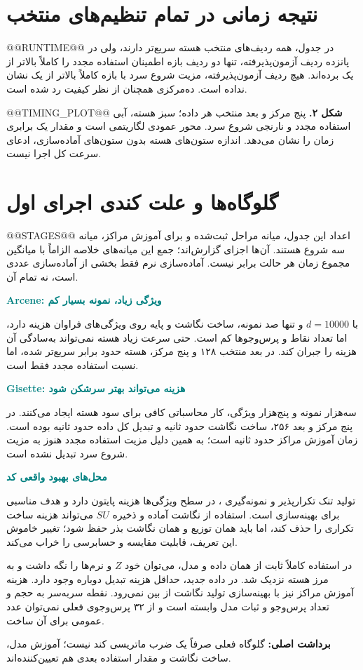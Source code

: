 \documentclass[11pt,a4paper]{article}
\newcommand{\lesson}[1]{\clearpage\section{#1}}
\newcommand{\key}[1]{\par\vspace{4pt}\noindent\colorbox{pale}{\parbox{\dimexpr\textwidth-2\fboxsep\relax}{\textbf{برداشت اصلی:} #1}}\par\vspace{3pt}}
\newcommand{\sub}[1]{\par\vspace{3pt}\textbf{\textcolor{teal}{#1}}\par}
\begin{document}
\lesson{نتیجه زمانی در تمام تنظیم‌های منتخب}
@@RUNTIME@@
در جدول، همه ردیف‌های منتخب هسته سریع‌تر دارند، ولی در پانزده ردیف آزمون‌پذیرفته، تنها دو ردیف  بازه اطمینان استفاده مجدد را کاملاً بالاتر از یک برده‌اند. هیچ ردیف آزمون‌پذیرفته، مزیت شروع سرد با بازه کاملاً بالاتر از یک نشان نداده است.  ده‌مرکزی همچنان از نظر کیفیت رد شده است.

@@TIMING_PLOT@@
\textbf{شکل ۲.} پنج مرکز و بعد منتخب هر داده؛ سبز هسته، آبی استفاده مجدد و نارنجی شروع سرد. محور عمودی لگاریتمی است و مقدار یک برابری زمان را نشان می‌دهد. اندازه ستون‌های هسته بدون ستون‌های آماده‌سازی، ادعای سرعت کل اجرا نیست.

\lesson{گلوگاه‌ها و علت کندی اجرای اول}
@@STAGES@@
اعداد این جدول، میانه مراحل ثبت‌شده و برای آموزش مراکز، میانه سه شروع هستند. آن‌ها اجزای گزارش‌اند؛ جمع این میانه‌های خلاصه الزاماً با میانگین مجموع زمان هر حالت برابر نیست. آماده‌سازی نرم فقط بخشی از آماده‌سازی عددی است، نه تمام آن.

\sub{Arcene: ویژگی زیاد، نمونه بسیار کم}
با \(d=10000\) و تنها صد نمونه، ساخت نگاشت و پایه روی ویژگی‌های فراوان هزینه دارد، اما تعداد نقاط و پرس‌وجوها کم است. حتی سرعت زیاد هسته نمی‌تواند به‌سادگی آن هزینه را جبران کند. در بعد منتخب ۱۲۸ و پنج مرکز، هسته حدود  برابر سریع‌تر شده، اما نسبت استفاده مجدد فقط  است.

\sub{Gisette: هزینه می‌تواند بهتر سرشکن شود}
سه‌هزار نمونه و پنج‌هزار ویژگی، کار محاسباتی کافی برای سود هسته ایجاد می‌کنند. در پنج مرکز و بعد ۲۵۶، ساخت نگاشت حدود  ثانیه و تبدیل کل داده حدود  ثانیه بوده است. زمان آموزش مراکز حدود  ثانیه است؛ به همین دلیل مزیت استفاده مجدد هنوز به مزیت شروع سرد تبدیل نشده است.

\sub{محل‌های بهبود واقعی کد}
تولید تنک تکرارپذیر و نمونه‌گیری ، در سطح ویژگی‌ها هزینه پایتون دارد و هدف مناسبی برای بهینه‌سازی است. استفاده از نگاشت آماده و ذخیره \(SU\) می‌تواند هزینه ساخت تکراری را حذف کند، اما باید همان توزیع و همان نگاشت بذر حفظ شود؛ تغییر خاموش این تعریف، قابلیت مقایسه و حسابرسی را خراب می‌کند.

در استفاده کاملاً ثابت از همان داده و مدل، می‌توان خود \(Z\) و نرم‌ها را نگه داشت و به مرز هسته نزدیک شد. در داده جدید، حداقل هزینه تبدیل دوباره وجود دارد. هزینه آموزش مراکز نیز با بهینه‌سازی تولید نگاشت از بین نمی‌رود. نقطه سربه‌سر به حجم و تعداد پرس‌وجو و ثبات مدل وابسته است و از ۳۲ پرس‌وجوی فعلی نمی‌توان عدد عمومی برای آن ساخت.
\key{گلوگاه فعلی صرفاً یک ضرب ماتریسی کند نیست؛ آموزش مدل، ساخت نگاشت و مقدار استفاده بعدی هم تعیین‌کننده‌اند.}
\end{document}

